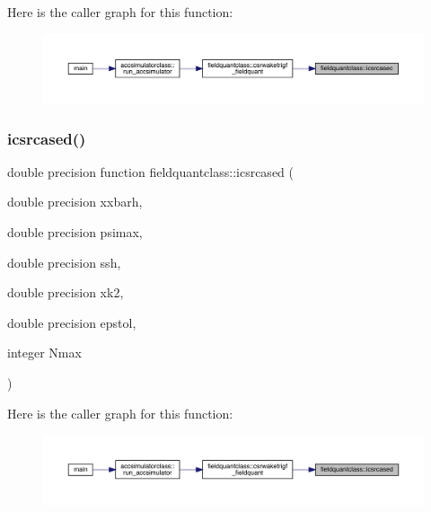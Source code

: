 Here is the caller graph for this function\+:\nopagebreak
\begin{figure}[H]
\begin{center}
\leavevmode
\includegraphics[width=350pt]{namespacefieldquantclass_a85aac5a4f515439e4263b24518d8c9dc_icgraph}
\end{center}
\end{figure}
\mbox{\label{namespacefieldquantclass_a6e7b51293ed012f0a90b5de96a3cef05}} 
\subsubsection{\texorpdfstring{icsrcased()}{icsrcased()}}
{\footnotesize\ttfamily double precision function fieldquantclass\+::icsrcased (\begin{DoxyParamCaption}\item[{double precision}]{xxbarh,  }\item[{double precision}]{psimax,  }\item[{double precision}]{ssh,  }\item[{double precision}]{xk2,  }\item[{double precision}]{epstol,  }\item[{integer}]{Nmax }\end{DoxyParamCaption})}

Here is the caller graph for this function\+:\nopagebreak
\begin{figure}[H]
\begin{center}
\leavevmode
\includegraphics[width=350pt]{namespacefieldquantclass_a6e7b51293ed012f0a90b5de96a3cef05_icgraph}
\end{center}
\end{figure}
\mbox{\label{namespacefieldquantclass_aae4177005bffdb768a50a98b860c111a}} 
